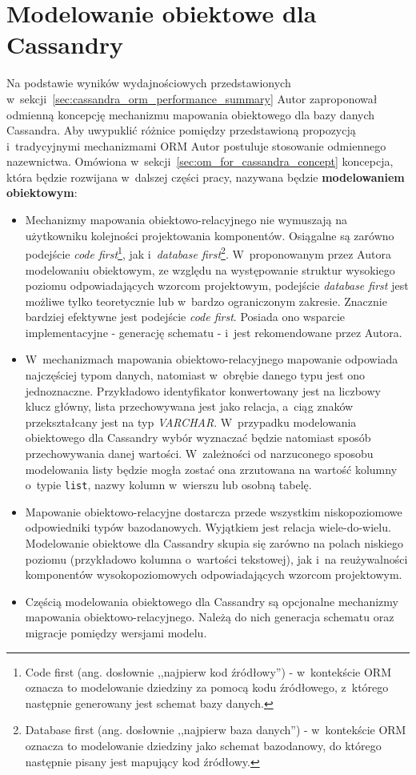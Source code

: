 
\chapter{Modelowanie obiektowe dla Cassandry}
\label{chap:cassandra_object_modeling}

Na podstawie wyników wydajnościowych przedstawionych w~sekcji~\ref{sec:cassandra_orm_performance_summary} Autor zaproponował odmienną koncepcję mechanizmu mapowania obiektowego dla bazy danych Cassandra. Aby uwypuklić różnice pomiędzy przedstawioną propozycją i~tradycyjnymi mechanizmami ORM Autor postuluje stosowanie odmiennego nazewnictwa. Omówiona w~sekcji~\ref{sec:om_for_cassandra_concept} koncepcja, która będzie rozwijana w~dalszej części pracy, nazywana będzie \textbf{modelowaniem obiektowym}:

\begin{itemize}
	\item Mechanizmy mapowania obiektowo-relacyjnego nie wymuszają na użytkowniku kolejności projektowania komponentów. Osiągalne są zarówno podejście \emph{code first}\footnote{Code first (ang. dosłownie ,,najpierw kod źródłowy'') - w~kontekście ORM oznacza to modelowanie dziedziny za pomocą kodu źródłowego, z~którego następnie generowany jest schemat bazy danych.}, jak i~\emph{database first}\footnote{Database first (ang. dosłownie ,,najpierw baza danych'') - w~kontekście ORM oznacza to modelowanie dziedziny jako schemat bazodanowy, do którego następnie pisany jest mapujący kod źródłowy.}. W~proponowanym przez Autora modelowaniu obiektowym, ze względu na występowanie struktur wysokiego poziomu odpowiadających wzorcom projektowym, podejście \emph{database first} jest możliwe tylko teoretycznie lub w~bardzo ograniczonym zakresie. Znacznie bardziej efektywne jest podejście \emph{code first}. Posiada ono wsparcie implementacyjne - generację schematu - i~jest rekomendowane przez Autora.
	\item W~mechanizmach mapowania obiektowo-relacyjnego mapowanie odpowiada najczęściej typom danych, natomiast w~obrębie danego typu jest ono jednoznaczne. Przykładowo identyfikator konwertowany jest na liczbowy klucz główny, lista przechowywana jest jako relacja, a~ciąg znaków przekształcany jest na typ \emph{VARCHAR}. W~przypadku modelowania obiektowego dla Cassandry wybór wyznaczać będzie natomiast sposób przechowywania danej wartości. W~zależności od narzuconego sposobu modelowania listy będzie mogła zostać ona zrzutowana na wartość kolumny o~typie \verb+list+, nazwy kolumn w~wierszu lub osobną tabelę.
	\item Mapowanie obiektowo-relacyjne dostarcza przede wszystkim niskopoziomowe odpowiedniki typów bazodanowych. Wyjątkiem jest relacja wiele-do-wielu. Modelowanie obiektowe dla Cassandry skupia się zarówno na polach niskiego poziomu (przykładowo kolumna o~wartości tekstowej), jak i~na reużywalności komponentów wysokopoziomowych odpowiadających wzorcom projektowym.
	\item Częścią modelowania obiektowego dla Cassandry są opcjonalne mechanizmy mapowania obiektowo-relacyjnego. Należą do nich generacja schematu oraz migracje pomiędzy wersjami modelu.
\end{itemize}

